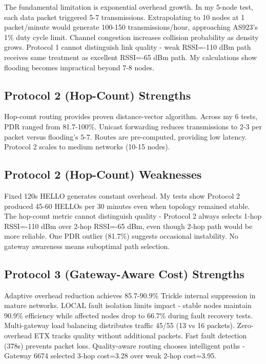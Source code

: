 The fundamental limitation is exponential overhead growth. In my 5-node test, each data packet triggered 5-7 transmissions. Extrapolating to 10 nodes at 1 packet/minute would generate 100-150 transmissions/hour, approaching AS923's 1\% duty cycle limit. Channel congestion increases collision probability as density grows. Protocol 1 cannot distinguish link quality - weak RSSI=-110 dBm path receives same treatment as excellent RSSI=-65 dBm path. My calculations show flooding becomes impractical beyond 7-8 nodes.

\subsection{Protocol 2 (Hop-Count) Strengths}

Hop-count routing provides proven distance-vector algorithm. Across my 6 tests, PDR ranged from 81.7-100\%. Unicast forwarding reduces transmissions to 2-3 per packet versus flooding's 5-7. Routes are pre-computed, providing low latency. Protocol 2 scales to medium networks (10-15 nodes).

\subsection{Protocol 2 (Hop-Count) Weaknesses}

Fixed 120s HELLO generates constant overhead. My tests show Protocol 2 produced 45-60 HELLOs per 30 minutes even when topology remained stable. The hop-count metric cannot distinguish quality - Protocol 2 always selects 1-hop RSSI=-110 dBm over 2-hop RSSI=-65 dBm, even though 2-hop path would be more reliable. One PDR outlier (81.7\%) suggests occasional instability. No gateway awareness means suboptimal path selection.

\subsection{Protocol 3 (Gateway-Aware Cost) Strengths}

Adaptive overhead reduction achieves 85.7-90.9\% Trickle internal suppression in mature networks. LOCAL fault isolation limits impact - stable nodes maintain 90.9\% efficiency while affected nodes drop to 66.7\% during fault recovery tests. Multi-gateway load balancing distributes traffic 45/55 (13 vs 16 packets). Zero-overhead ETX tracks quality without additional packets. Fast fault detection (378s) prevents packet loss. Quality-aware routing chooses intelligent paths - Gateway 6674 selected 3-hop cost=3.28 over weak 2-hop cost=3.95.


